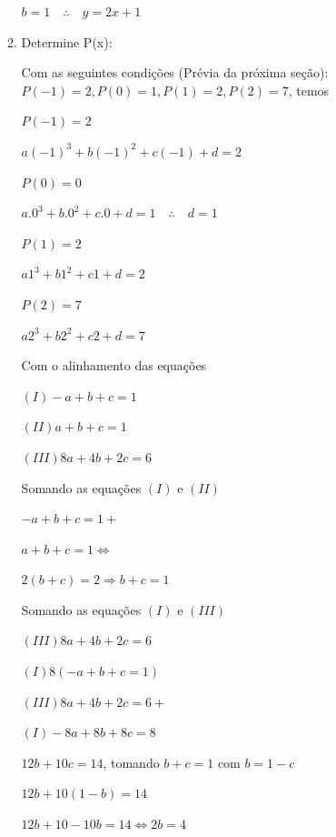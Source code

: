 \begin{multicols*}{2}
\begin{enumerate}[wide, labelwidth=!, labelindent=0pt]
\begin{enumerate}
                        $b = 1 \quad \therefore \quad y = 2x + 1$

                  \item Determine P(x):

                        Com as seguintes condições (Prévia da próxima seção):
                        $P(-1) = 2, P(0) = 1, P(1) = 2, P(2) = 7$, temos

                        $P(-1) = 2$

                        $a(-1)^3 + b(-1)^2 + c(-1) + d = 2$

                        $P(0) = 0 $

                        $a.0^3 + b.0^2 + c.0 + d = 1 \quad \therefore \quad d = 1$

                        $P(1) = 2$

                        $a1^3 + b1^2 + c1 + d = 2$

                        $P(2) = 7$

                        $a2^3 + b2^2 + c2 + d = 7$

                        Com o alinhamento das equações

                        $(I) -a +b +c = 1$

                        $(II) a+b+c = 1$

                        $(III) 8a + 4b + 2c = 6$

                        Somando as equações $(I)$ e $(II)$

                        $-a +b +c = 1 +$

                        $a +b+ c = 1 \Leftrightarrow$

                        $2(b+c) = 2 \Rightarrow b+c = 1$

                        Somando as equações $(I)$ e $(III)$

                        $(III) 8a +4b + 2c = 6$

                        $(I) 8(-a+b+c = 1)$

                        $(III) 8a +4b + 2c = 6 +$

                        $(I) -8a+8b+8c = 8$

                        $12b + 10c = 14$, tomando $b+c =1$ com $b = 1 - c$

                        $12b +10(1-b) = 14$

                        $12b +10 -10b = 14 \Leftrightarrow 2b = 4$


\end{enumerate}
\end{enumerate}
\end{multicols*}
